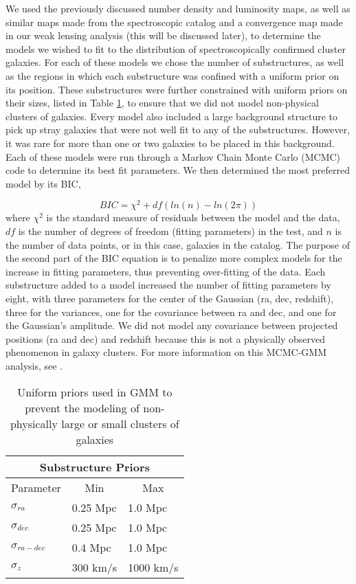 \documentclass[onecolumn]{aastex}
\begin{document}
We used the previously discussed number density and luminosity maps, as well as similar maps made from the spectroscopic catalog and a convergence map made in our weak lensing analysis (this will be discussed later), to determine the models we wished to fit to the distribution of spectroscopically confirmed cluster galaxies.  For each of these models we chose the number of substructures, as well as the regions in which each substructure was confined with a uniform prior on its position.  These substructures were further constrained with uniform priors on their sizes, listed in Table \ref{tab:GMMpriors}, to ensure that we did not model non-physical clusters of galaxies.  Every model also included a large background structure to pick up stray galaxies that were not well fit to any of the substructures.  However, it was rare for more than one or two galaxies to be placed in this background.  Each of these models were run through a Markov Chain Monte Carlo (MCMC) code to determine its best fit parameters.  We then determined the most preferred model by its BIC,

\begin{equation}
BIC = \chi^2 +df(ln(n) - ln(2\pi))
\end{equation}
where $\chi^2$ is the standard measure of residuals between the model and the data, $df$ is the number of degrees of freedom (fitting parameters) in the test, and $n$ is the number of data points, or in this case, galaxies in the catalog.  The purpose of the second part of the BIC equation is to penalize more complex models for the increase in fitting parameters, thus preventing over-fitting of the data.  Each substructure added to a model increased the number of fitting parameters by eight, with three parameters for the center of the Gaussian (ra, dec, redshift), three for the variances, one for the covariance between ra and dec, and one for the Gaussian's amplitude.  We did not model any covariance between projected positions (ra and dec) and redshift because this is not a physically observed phenomenon in galaxy clusters.  For more information on this MCMC-GMM analysis, see \cite{Golovich16}.

\begin{table}
\centering
\caption{Uniform priors used in GMM to prevent the modeling of non-physically large or small clusters of galaxies}
\begin{tabular}{lll}
\hline
\hline
\multicolumn{3}{c}{Substructure Priors} \\ \hline
\multicolumn{1}{c}{Parameter} & \multicolumn{1}{c}{Min} & \multicolumn{1}{c}{Max} \\ \hline
$\sigma_{ra}$       & 0.25 Mpc  & 1.0 Mpc    \\
$\sigma_{dec}$      & 0.25 Mpc  & 1.0 Mpc    \\
$\sigma_{ra-dec}$   & 0.4 Mpc   & 1.0 Mpc    \\
$\sigma_z$       	& 300 km/s  & 1000 km/s  \\ \hline       
\end{tabular}
\label{tab:GMMpriors}
\end{table}
\end{document}
